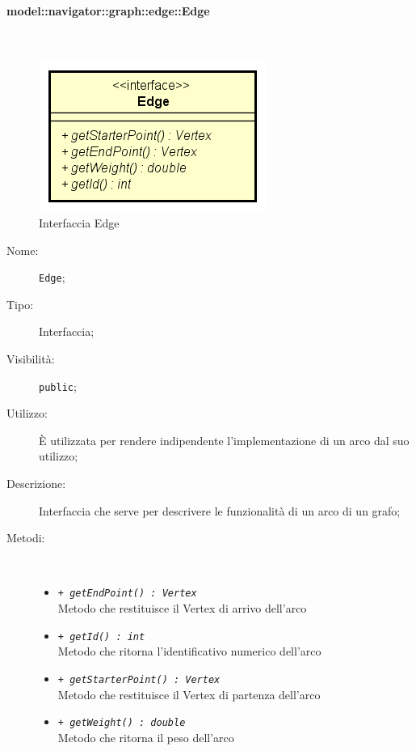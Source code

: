 \documentclass[../DefinizioneDiProdotto.tex]{subfiles}
\begin{document}
\paragraph{model::navigator::graph::edge::Edge}
\
\begin{figure}[H]
	\centering
	\includegraphics[width=\maxwidth]{img/Edge.png}
	\caption{Interfaccia Edge}\label{fig:model::navigator::graph::edge::Edge} 
\end{figure}
\begin{description}
	\item[Nome:] \texttt{Edge};
	\item[Tipo:] Interfaccia;
	\item[Visibilità:] \texttt{public};
	\item[Utilizzo:] È utilizzata per rendere indipendente l'implementazione di un arco dal suo utilizzo;
	\item[Descrizione:] Interfaccia che serve per descrivere le funzionalità di un arco di un grafo;
	\item[Metodi:] \
	\begin{itemize}
		\item \texttt{+ \textit{getEndPoint() : Vertex}}\\
		Metodo che restituisce il Vertex di arrivo dell'arco
		\item \texttt{+ \textit{getId() : int}}\\
		Metodo che ritorna l'identificativo numerico dell'arco
		\item \texttt{+ \textit{getStarterPoint() : Vertex}}\\
		Metodo che restituisce il Vertex di partenza dell'arco
		\item \texttt{+ \textit{getWeight() : double}}\\
		Metodo che ritorna il peso dell'arco
	\end{itemize}
\end{description}
\end{document}
